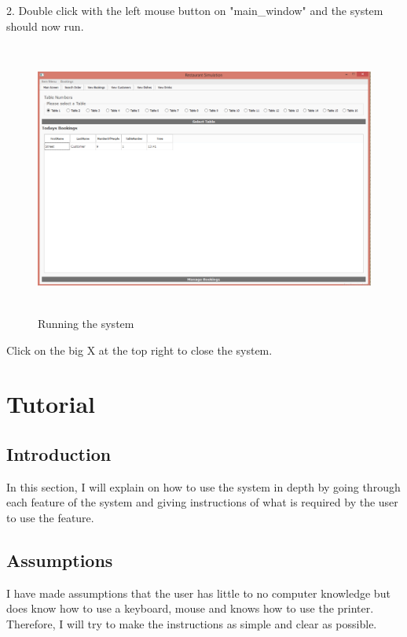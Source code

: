 \begin{landscape}
2. Double click with the left mouse button on "main\_window" and the system should now run.

\begin{figure}[H]
    \includegraphics[height = 9cm]{./Testing/images/mainscreen} 
    \caption{Running the system} \label{fig:runSystem}
\end{figure}

Click on the big X at the top right to close the system.

\end{landscape}

\section{Tutorial}

\subsection{Introduction}

In this section, I will explain on how to use the system in depth by going through each feature of the system and giving instructions of what is required by the user to use the feature.

\subsection{Assumptions}

I have made assumptions that the user has little to no computer knowledge but does know how to use a keyboard, mouse and knows how to use the printer. Therefore, I will try to make the instructions as simple and clear as possible.

